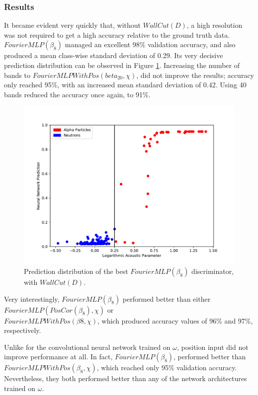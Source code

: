 \documentclass[10pt]{article}
\begin{document}
\subsubsection{Results}

It became evident very quickly that, without $WallCut(D)$, a high resolution was not required to get a high accuracy relative to the ground truth data. $FourierMLP(\beta_{8})$ managed an excellent 98\% validation accuracy, and also produced a mean class-wise standard deviation of 0.29. Its very decisive prediction distribution can be observed in Figure \ref{banded_no_pos_input_hist}. Increasing the number of bands to $FourierMLPWithPos(beta_{20}, \chi)$, did not improve the results; accuracy only reached 95\%, with an increased mean standard deviation of 0.42. Using 40 bands reduced the accuracy once again, to 91\%.

\begin{figure}[H]
    \centering
    \includegraphics[width=\textwidth]{banded_no_pos_input_hist}
    \caption{\label{banded_no_pos_input_hist} Prediction distribution of the best $FourierMLP(\beta_{8})$ discriminator, with $WallCut(D)$.}
\end{figure}

Very interestingly, $FourierMLP(\beta_{8})$ performed better than either $FourierMLP(PosCor(\beta_{8}), \chi)$ or \\ $FourierMLPWithPos(\beta{8}, \chi)$, which produced accuracy values of 96\% and 97\%, respectively.

Unlike for the convolutional neural network trained on $\omega$, position input did not improve performance at all. In fact, $FourierMLP(\beta_{8})$, performed better than $FourierMLPWithPos(\beta_{8}, \chi)$, which reached only 95\% validation accuracy. Nevertheless, they both performed better than any of the network architectures trained on $\omega$.
\end{document}
